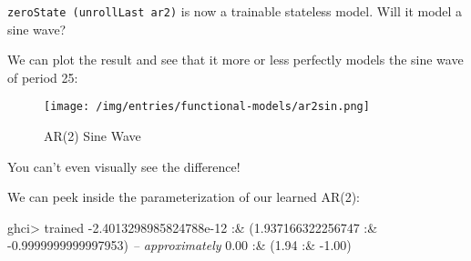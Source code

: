 \documentclass[]{article}
\newenvironment{Shaded}{}{}
\newcommand{\CommentTok}[1]{\textcolor[rgb]{0.38,0.63,0.69}{\textit{#1}}}
\newcommand{\DataTypeTok}[1]{\textcolor[rgb]{0.56,0.13,0.00}{#1}}
\newcommand{\DecValTok}[1]{\textcolor[rgb]{0.25,0.63,0.44}{#1}}
\newcommand{\FloatTok}[1]{\textcolor[rgb]{0.25,0.63,0.44}{#1}}
\newcommand{\FunctionTok}[1]{\textcolor[rgb]{0.02,0.16,0.49}{#1}}
\newcommand{\KeywordTok}[1]{\textcolor[rgb]{0.00,0.44,0.13}{\textbf{#1}}}
\newcommand{\NormalTok}[1]{#1}
\newcommand{\OtherTok}[1]{\textcolor[rgb]{0.00,0.44,0.13}{#1}}
\begin{document}
\texttt{zeroState\ (unrollLast\ ar2)} is now a trainable stateless model. Will
it model a sine wave?

\begin{Shaded}
\end{Shaded}

We can plot the result and see that it more or less perfectly models the sine
wave of period 25:

\begin{figure}
\centering
\texttt{[image: /img/entries/functional-models/ar2sin.png]}
\caption{AR(2) Sine Wave}
\end{figure}

You can't even visually see the difference!

We can peek inside the parameterization of our learned AR(2):

\begin{Shaded}
\begin{Highlighting}[]
\NormalTok{ghci}\FunctionTok{>}\NormalTok{ trained}
\FunctionTok{-}\FloatTok{2.4013298985824788e-12} \FunctionTok{:&}\NormalTok{ (}\FloatTok{1.937166322256747} \FunctionTok{:&} \FunctionTok{-}\FloatTok{0.9999999999997953}\NormalTok{)}
\CommentTok{-- approximately}
\FloatTok{0.00} \FunctionTok{:&}\NormalTok{ (}\FloatTok{1.94} \FunctionTok{:&} \FunctionTok{-}\FloatTok{1.00}\NormalTok{)}
\end{Highlighting}
\end{Shaded}
\end{document}
